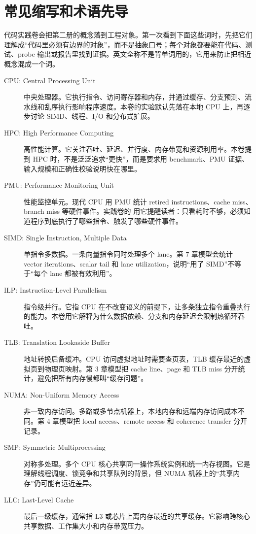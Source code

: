 \chapter*{常见缩写和术语先导}

代码实践卷会把第二册的概念落到工程对象。第一次看到下面这些词时，先把它们理解成“代码里必须有边界的对象”，而不是抽象口号；每个对象都要能在代码、测试、probe 输出或报告里找到证据。英文全称不是背单词用的，它用来防止把相近概念混成一个词。

\begin{description}
  \item[CPU: Central Processing Unit] 中央处理器。它执行指令、访问寄存器和内存，并通过缓存、分支预测、流水线和乱序执行影响程序速度。本卷的实验默认先落在本地 CPU 上，再逐步讨论 SIMD、线程、I/O 和分布式扩展。
  \item[HPC: High Performance Computing] 高性能计算。它关注吞吐、延迟、并行度、内存带宽和资源利用率。本卷提到 HPC 时，不是泛泛追求“更快”，而是要求用 benchmark、PMU 证据、输入规模和正确性校验说明快在哪里。
  \item[PMU: Performance Monitoring Unit] 性能监控单元。现代 CPU 用 PMU 统计 retired instructions、cache miss、branch miss 等硬件事件。实践卷的  用它提醒读者：只看耗时不够，必须知道程序到底执行了哪些指令、触发了哪些硬件事件。
  \item[SIMD: Single Instruction, Multiple Data] 单指令多数据。一条向量指令同时处理多个 lane。第 7 章模型会统计 vector iterations、scalar tail 和 lane utilization，说明“用了 SIMD”不等于“每个 lane 都被有效利用”。
  \item[ILP: Instruction-Level Parallelism] 指令级并行。它指 CPU 在不改变语义的前提下，让多条独立指令重叠执行的能力。本卷用它解释为什么数据依赖、分支和内存延迟会限制热循环吞吐。
  \item[TLB: Translation Lookaside Buffer] 地址转换后备缓冲。CPU 访问虚拟地址时需要查页表，TLB 缓存最近的虚拟页到物理页映射。第 3 章模型把 cache line、page 和 TLB miss 分开统计，避免把所有内存慢都叫“缓存问题”。
  \item[NUMA: Non-Uniform Memory Access] 非一致内存访问。多路或多节点机器上，本地内存和远端内存访问成本不同。第 4 章模型把 local access、remote access 和 coherence transfer 分开记录。
  \item[SMP: Symmetric Multiprocessing] 对称多处理。多个 CPU 核心共享同一操作系统实例和统一内存视图。它是理解线程调度、锁竞争和共享队列的背景，但 NUMA 机器上的“共享内存”仍可能有远近差异。
  \item[LLC: Last-Level Cache] 最后一级缓存，通常指 L3 或芯片上离内存最近的共享缓存。它影响跨核心共享数据、工作集大小和内存带宽压力。

\end{description}

